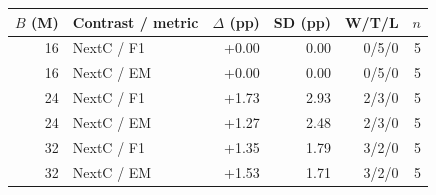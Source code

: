 \begin{tabular}{rlrrrr}
\toprule
$B$ (M) & Contrast / metric & $\Delta$ (pp) & SD (pp) & W/T/L & $n$\\
\midrule
16 & NextC / F1 & +0.00 & 0.00 & 0/5/0 & 5\\
16 & NextC / EM & +0.00 & 0.00 & 0/5/0 & 5\\
24 & NextC / F1 & +1.73 & 2.93 & 2/3/0 & 5\\
24 & NextC / EM & +1.27 & 2.48 & 2/3/0 & 5\\
32 & NextC / F1 & +1.35 & 1.79 & 3/2/0 & 5\\
32 & NextC / EM & +1.53 & 1.71 & 3/2/0 & 5\\
\bottomrule
\end{tabular}
